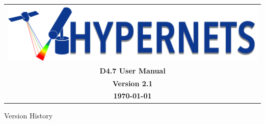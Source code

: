 \documentclass[a4paper,11pt,notitlepage]{article}
\newcommand{\numVersion}{2.1}
\newcommand{\titleDoc}{D4.7 User Manual}
\begin{document}
\hypersetup{pageanchor=false}
\begin{titlepage}
\thispagestyle{fancy}
\vspace*{8mm}
\begin{center}
    \begin{tabularx}{\textwidth}{c}
        \includegraphics[scale=.23]{logoHypernet.png}
        \vspace{2mm} \\
        \Large{\textbf{\titleDoc}} \\
        \Large{\textbf{Version \numVersion}} \\
        \Large{\textbf{\today}}
    \end{tabularx}
\end{center}
\end{titlepage}
\setcounter{page}{2}
\noindent Version History
\vspace{8pt}
\newline
\end{document}
